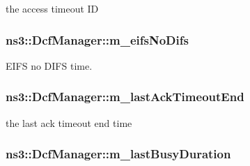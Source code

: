 the access timeout ID 

\subsubsection[{\texorpdfstring{m\+\_\+eifs\+No\+Difs}{m_eifsNoDifs}}]{ ns3\+::\+Dcf\+Manager\+::m\+\_\+eifs\+No\+Difs\hspace{0.3cm}{\ttfamily [private]}}\hypertarget{classns3_1_1DcfManager_a9bf83a117ac175213dd7776c335d5523}{}\label{classns3_1_1DcfManager_a9bf83a117ac175213dd7776c335d5523}


E\+I\+FS no D\+I\+FS time. 

\subsubsection[{\texorpdfstring{m\+\_\+last\+Ack\+Timeout\+End}{m_lastAckTimeoutEnd}}]{ ns3\+::\+Dcf\+Manager\+::m\+\_\+last\+Ack\+Timeout\+End\hspace{0.3cm}{\ttfamily [private]}}\hypertarget{classns3_1_1DcfManager_a8a224e47f94cc69bc3dd0d88f2099a15}{}\label{classns3_1_1DcfManager_a8a224e47f94cc69bc3dd0d88f2099a15}


the last ack timeout end time 

\subsubsection[{\texorpdfstring{m\+\_\+last\+Busy\+Duration}{m_lastBusyDuration}}]{ ns3\+::\+Dcf\+Manager\+::m\+\_\+last\+Busy\+Duration\hspace{0.3cm}{\ttfamily [private]}}\hypertarget{classns3_1_1DcfManager_adb6bad3b77a9c74b3c0e206ddcce066b}{}\label{classns3_1_1DcfManager_adb6bad3b77a9c74b3c0e206ddcce066b}


